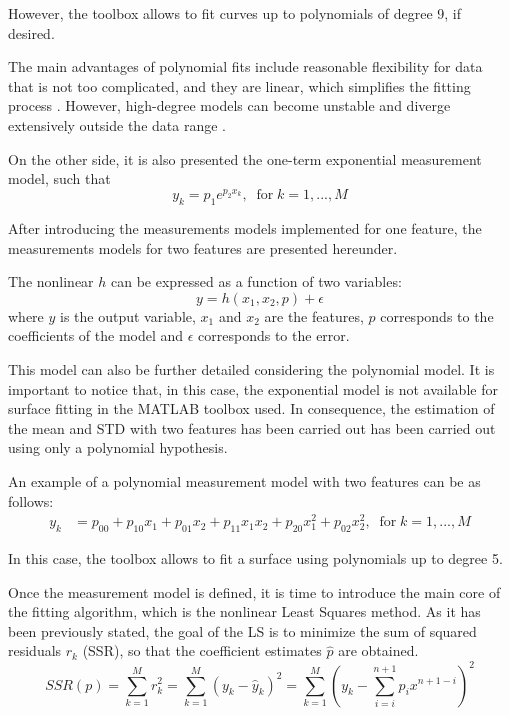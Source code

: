 \documentclass[a4paper, report, oneside, UKenglish]{memoir}
\begin{document}
However, the toolbox allows to fit curves up to polynomials of degree 9, if desired. 

The main advantages of polynomial fits include reasonable flexibility for data that is not too complicated, and they are linear, which simplifies the fitting process \cite{MathWorksRegression}. However, high-degree models can become unstable and diverge extensively outside the data range \cite{MathWorksRegression}. 

On the other side, it is also presented the one-term exponential measurement model, such that 
\begin{equation}
    y_k = p_{1}e^{p_{2}x_{k}},  \;\;\mbox{for}\; k = 1,...,M
\end{equation}

After introducing the measurements models implemented for one feature, the measurements models for two features are presented hereunder.

The nonlinear $h$ can be expressed as a function of two variables:
\begin{equation}
    y = h(x_{1},x_{2},p) + \epsilon
\end{equation}
where $y$ is the output variable, $x_{1}$ and $x_{2}$ are the features, $p$ corresponds to the coefficients of the model and $\epsilon$ corresponds to the error. 

This model can also be further detailed considering the polynomial model. It is important to notice that, in this case, the exponential model is not available for surface fitting in the MATLAB toolbox used. In consequence, the estimation of the mean and STD with two features has been carried out has been carried out using only a polynomial hypothesis.

An example of a polynomial measurement model with two features can be as follows:
\begin{equation}
\begin{split}
    y_k &= p_{00} + p_{10}x_{1} + p_{01}x_{2} + p_{11}x_{1}x_{2} + p_{20}x^{2}_{1} + p_{02}x^{2}_{2},    \;\;\mbox{for}\; k = 1,...,M
\end{split}
\end{equation}

In this case, the toolbox allows to fit a surface using polynomials up to degree 5. 

Once the measurement model is defined, it is time to introduce the main core of the fitting algorithm, which is the nonlinear Least Squares method. As it has been previously stated, the goal of the LS is to minimize the sum of squared residuals $r_k$ (SSR), so that the coefficient estimates $\hat{p}$ are obtained.
\begin{equation}\label{eq:SSR}
    SSR(p) = \sum\limits_{k=1}^{M}{r}_{k}^{2} = \sum\limits_{k=1}^{M}(y_k - \hat{y}_k)^2 = \sum\limits_{k=1}^{M}(y_k - \sum\limits_{i=i}^{n+1} p_{i}x^{n+1-i})^2
\end{equation}
\end{document}
